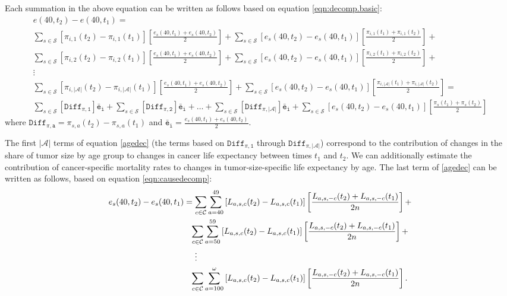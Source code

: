 \documentclass[11pt,letterpaper]{article}
\theoremstyle{plain}
\theoremstyle{remark}
\numberwithin{equation}{section}
\begin{document}
 Each summation in the above equation can be written as follows based
 on equation \eqref{eqn:decomp.basic}:
\begin{multline}
  e(40,t_2)-e(40,t_1)= \\
  \sum_{s\in\mathcal{S}}\left[\pi_{i,1}(t_2)-\pi_{i,1}(t_1) \right]\left[\frac{e_s(40,t_1)+e_s(40,t_2)}{2}\right]+\sum_{s\in\mathcal{S}}\left[e_s(40,t_2)-e_s(40,t_1) \right]\left[\frac{\pi_{i,1}(t_1)+\pi_{i,1}(t_2)}{2}\right] +\\
  \sum_{s\in\mathcal{S}}\left[\pi_{i,2}(t_2)-\pi_{i,2}(t_1) \right]\left[\frac{e_s(40,t_1)+e_s(40,t_2)}{2}\right]+\sum_{s\in\mathcal{S}}\left[e_s(40,t_2)-e_s(40,t_1) \right]\left[\frac{\pi_{i,2}(t_1)+\pi_{i,2}(t_2)}{2}\right] +\\
  \vdots \\
  \sum_{s\in\mathcal{S}}\left[\pi_{i,{\left\vert\mathcal{A}\right\vert}}(t_2)-\pi_{i,{\left\vert\mathcal{A}\right\vert}}(t_1) \right]\left[\frac{e_s(40,t_1)+e_s(40,t_2)}{2}\right]+\sum_{s\in\mathcal{S}}\left[e_s(40,t_2)-e_s(40,t_1) \right]\left[\frac{\pi_{i,{\left\vert\mathcal{A}\right\vert}}(t_1)+\pi_{i,{\left\vert\mathcal{A}\right\vert}}(t_2)}{2}\right] =\\
  \sum_{s\in\mathcal{S}}\left[\mathtt{Diff_{\pi,1}} \right]\mathtt{\bar{e}_i} + \sum_{s\in\mathcal{S}}\left[\mathtt{Diff_{\pi,2}} \right]\mathtt{\bar{e}_i} + 
  \dots +
 \sum_{s\in\mathcal{S}}\left[\mathtt{Diff_{\pi,{\left\vert\mathcal{A}\right\vert}}} \right]\mathtt{\bar{e}_i} +\sum_{s\in\mathcal{S}}\left[e_s(40,t_2)-e_s(40,t_1)\right]\left[\frac{\pi_s(t_1)+\pi_s(t_2)}{2}\right]
\label{agedec}
\end{multline}
where $\mathtt{Diff_{\pi,a}}=\pi_{s,a}(t_2)-\pi_{s,a}(t_1)$ and $\mathtt{\bar{e}_i}=\frac{e_s(40,t_1)+e_s(40,t_2)}{2}$.

The first $\left\vert\mathcal{A}\right\vert$ terms of equation
\eqref{agedec} (the terms based on $\mathtt{Diff_{\pi,1}}$ through
$\mathtt{Diff_{\pi,{\left\vert\mathcal{A}\right\vert}}}$) correspond
to the contribution of changes in the share of tumor size by age group
to changes in cancer life expectancy between times $t_1$ and $t_2$. We
can additionally estimate the contribution of cancer-specific
mortality rates to changes in tumor-size-specific life expectancy by
age. The last term of \eqref{agedec} can be written as follows, based
on equation \eqref{eqn:causedecomp}:
\begin{align}
  e_s(40,t_2)-e_s(40,t_1)&=\sum_{c\in\mathcal{C}} \sum_{a=40}^{49}\left[L_{a,s,c}(t_2)-L_{a,s,c}(t_1) \right] \left[\frac{L_{a,s,-c}(t_2)+L_{a,s,-c}(t_1) }{2n} \right] + \notag\\
  &\phantom{=}\sum_{c\in\mathcal{C}} \sum_{a=50}^{59}\left[L_{a,s,c}(t_2)-L_{a,s,c}(t_1) \right] \left[\frac{L_{a,s,-c}(t_2)+L_{a,s,-c}(t_1) }{2n} \right] + \notag\\
  &\phantom{=  .}\vdots \notag\\
  &\phantom{=}\sum_{c\in\mathcal{C}} \sum_{a=100}^{\omega}\left[L_{a,s,c}(t_2)-L_{a,s,c}(t_1) \right] \left[\frac{L_{a,s,-c}(t_2)+L_{a,s,-c}(t_1) }{2n} \right] .
\end{align}
\end{document}
